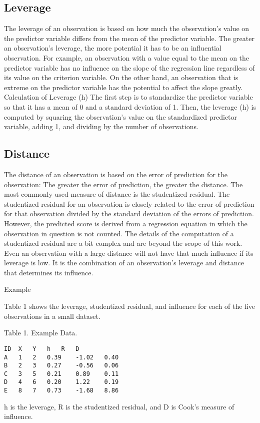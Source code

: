 \subsection*{Leverage}
The leverage of an observation is based on how much the observation's value on the predictor variable differs from the mean of the predictor variable. The greater an observation's leverage, the more potential it has to be an influential observation. For example, an observation with a value equal to the mean on the predictor variable has no influence on the slope of the regression line regardless of its value on the criterion variable. On the other hand, an observation that is extreme on the predictor variable has the potential to affect the slope greatly.
Calculation of Leverage (h)
The first step is to standardize the predictor variable so that it has a mean of 0 and a standard deviation of 1. Then, the leverage (h) is computed by squaring the observation's value on the standardized predictor variable, adding 1, and dividing by the number of observations.
\subsection*{Distance}
The distance of an observation is based on the error of prediction for the observation: The greater the error of prediction, the greater the distance. The most commonly used measure of distance is the studentized residual. The studentized residual for an observation is closely related to the error of prediction for that observation divided by the standard deviation of the errors of prediction. However, the predicted score is derived from a regression equation in which the observation in question is not counted. The details of the computation of a studentized residual are a bit complex and are beyond the scope of this work.
Even an observation with a large distance will not have that much influence if its leverage is low. It is the combination of an observation's leverage and distance that determines its influence.

Example

Table 1 shows the leverage, studentized residual, and influence for each of the five observations in a small dataset.
\begin{framed}
Table 1. Example Data.
\begin{verbatim}
ID	X	Y	h	R	D
A	1	2	0.39	-1.02	0.40
B	2	3	0.27	-0.56	0.06
C	3	5	0.21	0.89	0.11
D	4	6	0.20	1.22	0.19
E	8	7	0.73	-1.68	8.86
\end{verbatim}
\end{framed}
h is the leverage, R is the studentized residual, and D is Cook's measure of influence.

